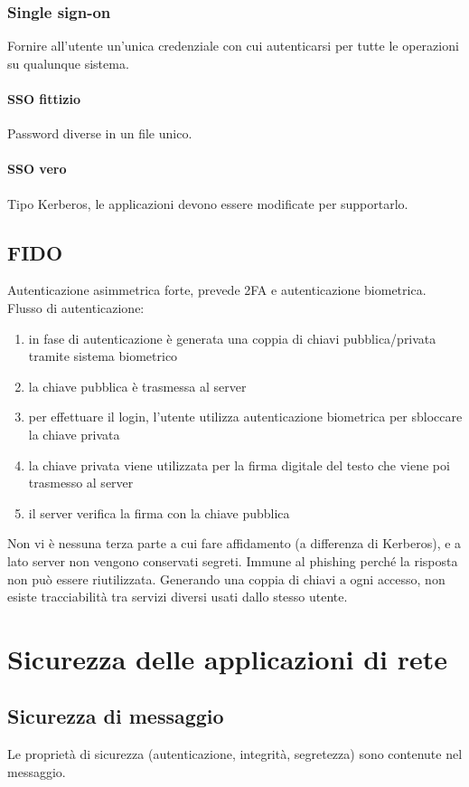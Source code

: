 \documentclass[11pt]{article}
\begin{document}
\subsubsection{Single sign-on}
Fornire all'utente un'unica credenziale con cui autenticarsi per tutte le operazioni su qualunque sistema.
\paragraph*{SSO fittizio}
Password diverse in un file unico.
\paragraph*{SSO vero}
Tipo Kerberos, le applicazioni devono essere modificate per supportarlo.
\subsection{FIDO}
Autenticazione asimmetrica forte, prevede 2FA e autenticazione biometrica.
Flusso di autenticazione:
\begin{enumerate}
    \item in fase di autenticazione è generata una coppia di chiavi pubblica/privata tramite sistema biometrico 
    \item la chiave pubblica è trasmessa al server 
    \item per effettuare il login, l'utente utilizza autenticazione biometrica per sbloccare la chiave privata 
    \item la chiave privata viene utilizzata per la firma digitale del testo che viene poi trasmesso al server 
    \item il server verifica la firma con la chiave pubblica 
\end{enumerate}
Non vi è nessuna terza parte a cui fare affidamento (a differenza di Kerberos), e a lato server non vengono conservati 
segreti. Immune al phishing perché la risposta non può essere riutilizzata. Generando una coppia di chiavi a ogni accesso, 
non esiste tracciabilità tra servizi diversi usati dallo stesso utente.
\section{Sicurezza delle applicazioni di rete}
\subsection{Sicurezza di messaggio}
Le proprietà di sicurezza (autenticazione, integrità, segretezza) sono contenute nel messaggio. 
\end{document}
